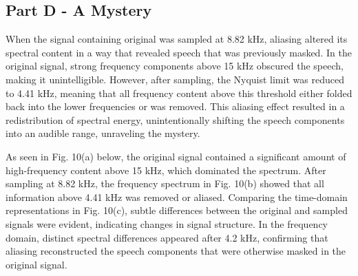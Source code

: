\documentclass[12pt]{article}
\begin{document}
\subsection{Part D - A Mystery}
When the signal containing original was sampled at 8.82 kHz, aliasing altered its spectral content in a way that revealed speech that was previously masked. In the original signal, strong frequency components above 15 kHz obscured the speech, making it unintelligible. However, after sampling, the Nyquist limit was reduced to 4.41 kHz, meaning that all frequency content above this threshold either folded back into the lower frequencies or was removed. This aliasing effect resulted in a redistribution of spectral energy, unintentionally shifting the speech components into an audible range, unraveling the mystery.

As seen in Fig. 10(a) below, the original signal contained a significant amount of high-frequency content above 15 kHz, which dominated the spectrum. After sampling at 8.82 kHz, the frequency spectrum in Fig. 10(b) showed that all information above 4.41 kHz was removed or aliased. Comparing the time-domain representations in Fig. 10(c), subtle differences between the original and sampled signals were evident, indicating changes in signal structure. In the frequency domain, distinct spectral differences appeared after 4.2 kHz, confirming that aliasing reconstructed the speech components that were otherwise masked in the original signal. 
\FloatBarrier
\end{document}
